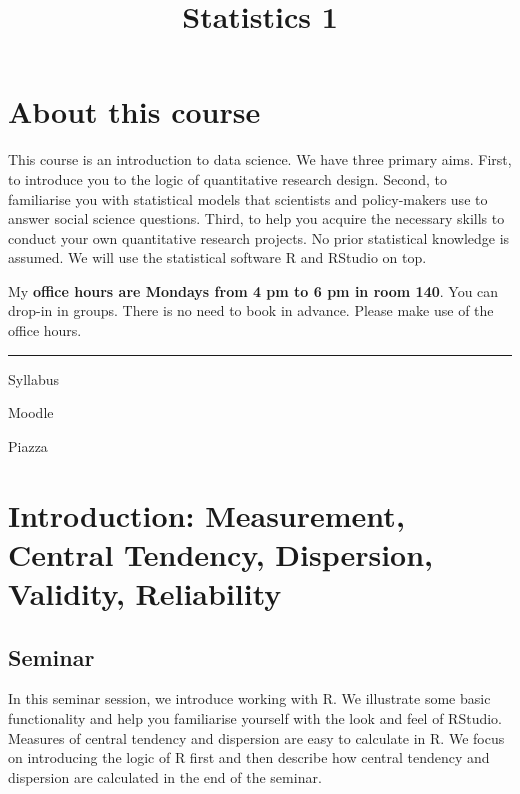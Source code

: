 \documentclass[]{article}
\title{Statistics 1}
\author{}
\date{}
\theoremstyle{definition}
\theoremstyle{definition}
\theoremstyle{definition}
\theoremstyle{remark}
\begin{document}
\maketitle

{
\setcounter{tocdepth}{2}
\tableofcontents
}
\section*{About this course}\label{about-this-course}

This course is an introduction to data science. We have three primary
aims. First, to introduce you to the logic of quantitative research
design. Second, to familiarise you with statistical models that
scientists and policy-makers use to answer social science questions.
Third, to help you acquire the necessary skills to conduct your own
quantitative research projects. No prior statistical knowledge is
assumed. We will use the statistical software R and RStudio on top.

My \textbf{office hours are Mondays from 4 pm to 6 pm in room 140}. You
can drop-in in groups. There is no need to book in advance. Please make
use of the office hours.

\begin{center}\rule{0.5\linewidth}{\linethickness}\end{center}

Syllabus

Moodle

Piazza

\section{Introduction: Measurement, Central Tendency, Dispersion,
Validity,
Reliability}\label{introduction-measurement-central-tendency-dispersion-validity-reliability}

\subsection{Seminar}\label{seminar}

In this seminar session, we introduce working with R. We illustrate some
basic functionality and help you familiarise yourself with the look and
feel of RStudio. Measures of central tendency and dispersion are easy to
calculate in R. We focus on introducing the logic of R first and then
describe how central tendency and dispersion are calculated in the end
of the seminar.
\end{document}
